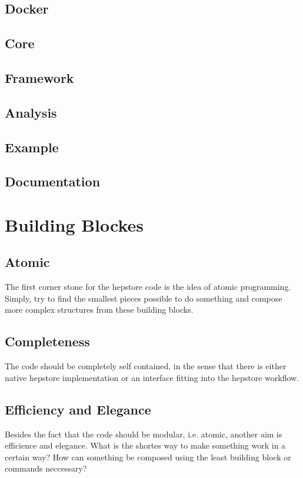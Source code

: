 \subsection{Docker}
\subsection{Core}
\subsection{Framework}
\subsection{Analysis}
\subsection{Example}
\subsection{Documentation}

\section{Building Blockes}

\subsection{Atomic}
The first corner stone for the hepstore code is the idea of atomic
programming. Simply, try to find the smallest pieces possible to do
something and compose more complex structures from these building
blocks.

\subsection{Completeness}
The code should be completely self contained, in the sense that there
is either native hepstore implementation or an interface fitting into
the hepstore workflow.

\subsection{Efficiency and Elegance}
Besides the fact that the code should be modular, i.e. atomic, another
aim is efficience and elegance. What is the shortes way to make
something work in a certain way? How can something be composed using
the least building block or commands neccessary?

